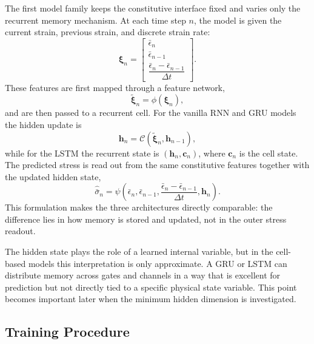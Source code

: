 \documentclass[11pt,a4paper]{article}
\newcommand{\epsbar}{\bar{\epsilon}}
\newcommand{\sigbar}{\bar{\sigma}}
\newcommand{\dt}{\Delta t}
\begin{document}
The first model family keeps the constitutive interface fixed and varies only the recurrent memory mechanism. At each time step $n$, the model is given the current strain, previous strain, and discrete strain rate:
\begin{equation}
\bm{\xi}_n=
\begin{bmatrix}
\epsbar_n\\
\epsbar_{n-1}\\
\dfrac{\epsbar_n-\epsbar_{n-1}}{\dt}
\end{bmatrix}.
\label{eq:step_features}
\end{equation}
These features are first mapped through a feature network,
\begin{equation}
\tilde{\bm{\xi}}_n=\phi(\bm{\xi}_n),
\label{eq:feature_network}
\end{equation}
and are then passed to a recurrent cell. For the vanilla RNN and GRU models the hidden update is
\begin{equation}
\bm{h}_n=\mathcal{C}\!\left(\tilde{\bm{\xi}}_n,\bm{h}_{n-1}\right),
\label{eq:cell_update}
\end{equation}
while for the LSTM the recurrent state is $(\bm{h}_n,\bm{c}_n)$, where $\bm{c}_n$ is the cell state. The predicted stress is read out from the same constitutive features together with the updated hidden state,
\begin{equation}
\hat{\sigbar}_n=\psi\!\left(\epsbar_n,\epsbar_{n-1},\frac{\epsbar_n-\epsbar_{n-1}}{\dt},\bm{h}_n\right).
\label{eq:cell_readout}
\end{equation}
This formulation makes the three architectures directly comparable: the difference lies in how memory is stored and updated, not in the outer stress readout.

The hidden state plays the role of a learned internal variable, but in the cell-based models this interpretation is only approximate. A GRU or LSTM can distribute memory across gates and channels in a way that is excellent for prediction but not directly tied to a specific physical state variable. This point becomes important later when the minimum hidden dimension is investigated.

\subsection{Training Procedure}
\end{document}
